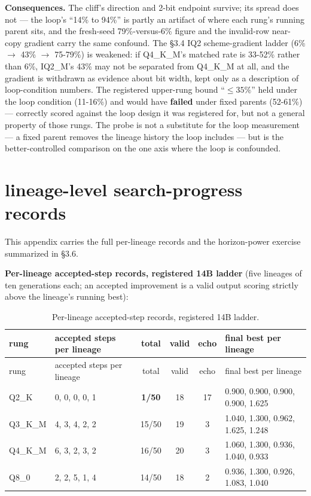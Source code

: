\textbf{Consequences.} The cliff's direction and 2-bit endpoint survive; its spread does not --- the loop's ``14\% to 94\%'' is partly an artifact of where each rung's running parent sits, and the fresh-seed 79\%-versus-6\% figure and the invalid-row near-copy gradient carry the same confound. The \S3.4 IQ2 scheme-gradient ladder (6\% $\rightarrow$ 43\% $\rightarrow$ 75-79\%) is weakened: if Q4\_K\_M's matched rate is 33-52\% rather than 6\%, IQ2\_M's 43\% may not be separated from Q4\_K\_M at all, and the gradient is withdrawn as evidence about bit width, kept only as a description of loop-condition numbers. The registered upper-rung bound ``$\le 35\%$'' held under the loop condition (11-16\%) and would have \textbf{failed} under fixed parents (52-61\%) --- correctly scored against the loop design it was registered for, but not a general property of those rungs. The probe is not a substitute for the loop measurement --- a fixed parent removes the lineage history the loop includes --- but is the better-controlled comparison on the one axis where the loop is confounded.

\section{lineage-level search-progress records}

This appendix carries the full per-lineage records and the horizon-power exercise summarized in \S3.6.

\textbf{Per-lineage accepted-step records, registered 14B ladder} (five lineages of ten generations each; an accepted improvement is a valid output scoring strictly above the lineage's running best):

\begingroup
\footnotesize
\begin{longtable}{lp{3cm}ccccp{3.8cm}}
\caption{Per-lineage accepted-step records, registered 14B ladder.}\\
\toprule
rung & accepted steps per lineage & total & valid & echo & \multicolumn{2}{l}{final best per lineage} \\
\midrule
\endfirsthead
\toprule
rung & accepted steps per lineage & total & valid & echo & \multicolumn{2}{l}{final best per lineage} \\
\midrule
\endhead
\bottomrule
\endlastfoot
Q2\_K & 0, 0, 0, 0, 1 & \textbf{1/50} & 18 & 17 & \multicolumn{2}{l}{0.900, 0.900, 0.900, 0.900, 1.625} \\
Q3\_K\_M & 4, 3, 4, 2, 2 & 15/50 & 19 & 3 & \multicolumn{2}{l}{1.040, 1.300, 0.962, 1.625, 1.248} \\
Q4\_K\_M & 6, 3, 2, 3, 2 & 16/50 & 20 & 3 & \multicolumn{2}{l}{1.060, 1.300, 0.936, 1.040, 0.933} \\
Q8\_0 & 2, 2, 5, 1, 4 & 14/50 & 18 & 2 & \multicolumn{2}{l}{0.936, 1.300, 0.926, 1.083, 1.040} \\
\end{longtable}
\endgroup

